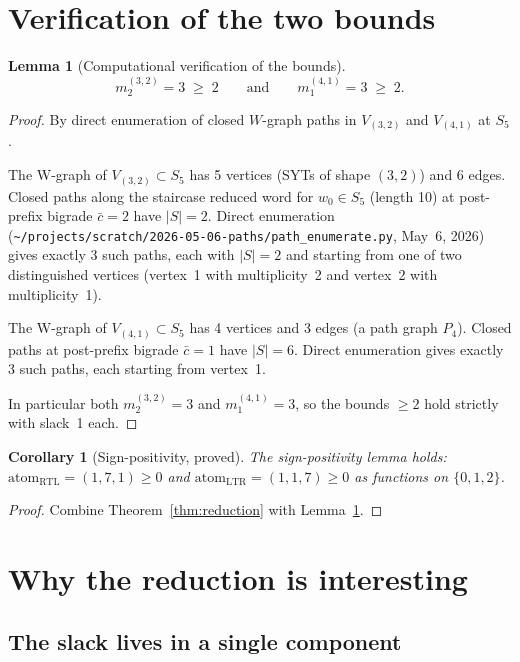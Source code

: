 \documentclass[11pt]{article}
\newtheorem{lemma}[theorem]{Lemma}
\newtheorem{corollary}[theorem]{Corollary}
\theoremstyle{definition}
\begin{document}
\section{Verification of the two bounds}

\begin{lemma}[Computational verification of the bounds]\label{lem:bounds}
\[
m^{(3,2)}_2 = 3 \;\geq\; 2 \qquad \text{and} \qquad m^{(4,1)}_1 = 3 \;\geq\; 2.
\]
\end{lemma}

\begin{proof}
By direct enumeration of closed $W$-graph paths in $V_{(3,2)}$ and $V_{(4,1)}$ at $S_5$.

The W-graph of $V_{(3,2)} \subset S_5$ has 5 vertices (SYTs of shape $(3,2)$) and 6 edges. Closed paths along the staircase reduced word for $w_0 \in S_5$ (length 10) at post-prefix bigrade $\bar c = 2$ have $|S| = 2$. Direct enumeration (\texttt{\textasciitilde/projects/scratch/2026-05-06-paths/path\_enumerate.py}, May~6, 2026) gives exactly 3 such paths, each with $|S| = 2$ and starting from one of two distinguished vertices (vertex~1 with multiplicity~2 and vertex~2 with multiplicity~1).

The W-graph of $V_{(4,1)} \subset S_5$ has 4 vertices and 3 edges (a path graph $P_4$). Closed paths at post-prefix bigrade $\bar c = 1$ have $|S| = 6$. Direct enumeration gives exactly 3 such paths, each starting from vertex~1.

In particular both $m^{(3,2)}_2 = 3$ and $m^{(4,1)}_1 = 3$, so the bounds $\geq 2$ hold strictly with slack~1 each.
\end{proof}

\begin{corollary}[Sign-positivity, proved]\label{cor:proved}
The sign-positivity lemma holds: $\mathrm{atom}_{\mathrm{RTL}} = (1, 7, 1) \geq 0$ and $\mathrm{atom}_{\mathrm{LTR}} = (1, 1, 7) \geq 0$ as functions on $\{0, 1, 2\}$.
\end{corollary}

\begin{proof}
Combine Theorem~\ref{thm:reduction} with Lemma~\ref{lem:bounds}.
\end{proof}

\section{Why the reduction is interesting}

\subsection*{The slack lives in a single component}
\end{document}
